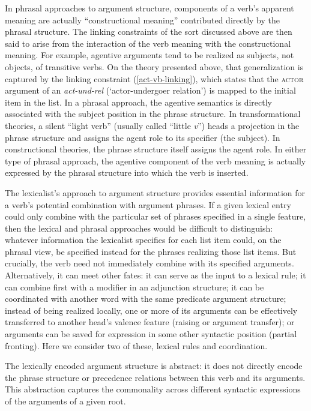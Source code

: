 \documentclass[output=paper
                ,modfonts
                ,nonflat
	        ,collection
	        ,collectionchapter
	        ,collectiontoclongg
 	        ,biblatex
                ,babelshorthands
                ,newtxmath
                ,draftmode
                ,colorlinks, citecolor=brown
]{./langsci/langscibook}
\begin{document}
In phrasal approaches  to argument structure, components of a verb's apparent meaning are actually ``constructional meaning'' contributed directly by the phrasal structure.  The linking constraints of the sort discussed above are then said to arise from the interaction of the verb meaning with the constructional meaning.  For example, agentive arguments tend to be realized as subjects, not objects, of transitive verbs.  On the theory presented above, that generalization is captured by the linking constraint (\ref{act-vb-linking}), which states that the \textsc{actor} argument of an \textit{act-und-rel} (`actor-undergoer relation') is mapped to the initial item in the \argst list.  In a phrasal approach, the agentive semantics is directly associated with the subject position in the phrase structure.  In transformational theories, a silent ``light verb'' (usually called ``little \textit{v}'') heads a projection in the phrase structure and assigns the agent role to its specifier (the subject).  In constructional theories, the phrase structure itself assigns the agent role.  In either type of phrasal approach, the agentive component of the verb meaning is actually expressed by the phrasal structure into which the verb is inserted.  


The lexicalist’s approach to argument structure provides essential information for a verb's potential
combination with argument phrases.   If a given lexical entry could only  combine with the particular set of phrases specified in a single \val feature, then the lexical and phrasal approaches would be difficult to distinguish: whatever information the lexicalist specifies for each \val list item could, on the phrasal view, be specified instead for the phrases realizing those list items.  
But crucially, the verb need not immediately combine with its specified
arguments.  Alternatively, it can meet other fates: it can serve as the input to a lexical rule; it
can combine first with a modifier in an adjunction structure; it can be coordinated with another
word with the same predicate argument structure; instead of being realized locally, one or more of
its arguments can be effectively transferred to another head’s valence feature (raising or argument
transfer); or arguments can be saved for expression in some other syntactic position (partial
fronting).   Here we consider two of these, lexical rules and coordination.  
 
The lexically encoded argument structure is abstract: it does not directly encode the phrase structure or
precedence relations between this verb and its arguments. This abstraction captures the commonality
across different syntactic expressions of the arguments of a given root.
\end{document}
